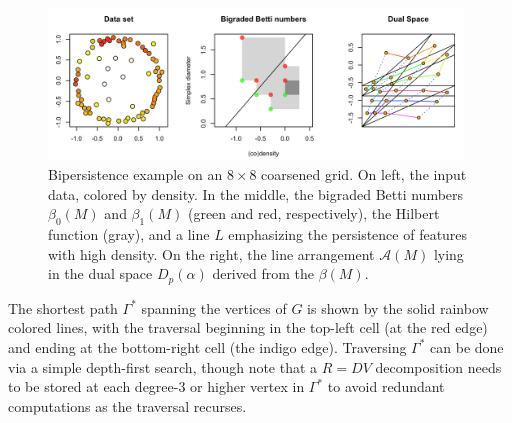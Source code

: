 \documentclass{article} %
\begin{document}
\begin{figure}[t]
	\includegraphics[width=0.98\textwidth]{bifiltration_ex2}
	\caption{Bipersistence example on an $8 \times 8$ coarsened grid. On left, the input data, colored by density. In the middle, the bigraded Betti numbers $\beta_0(M)$ and $\beta_1(M)$ (green and red, respectively), the Hilbert function (gray), and a line $L$ emphasizing the persistence of features with high density. On the right, the line arrangement $\mathcal{A}(M)$ lying in the dual space $D_p(\alpha)$ derived from the $\beta(M)$. }
	\label{fig:bifiltration_ex2}
\end{figure}
The shortest path $\Gamma^\ast$ spanning the vertices of $G$ is shown by the solid rainbow colored lines, with the traversal beginning in the top-left cell (at the red edge) and ending at the bottom-right cell (the indigo edge). Traversing $\Gamma^\ast$ can be done via a simple depth-first search, though note that a $R=DV$ decomposition needs to be stored at each degree-3 or higher vertex in $\Gamma^\ast$ to avoid redundant computations as the traversal recurses. 
\\

\end{document}
